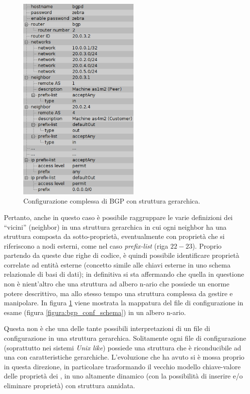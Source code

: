 \begin{figure}[!htb]
	\centering
	\includegraphics[width=6cm]{images/bgp_conf_tree.png}
	\caption{Configurazione complessa di BGP con struttura gerarchica.}
	\label{figura:bgp_conf_tree}
\end{figure}

Pertanto, anche in questo caso è possibile raggruppare le varie definizioni dei ``vicini'' (neighbor) in una struttura gerarchica in cui ogni neighbor ha una struttura composta da sotto-proprietà, eventualmente con proprietà che si riferiscono a nodi esterni, come nel caso \emph{prefix-list} (riga $22-23$). Proprio partendo da queste due righe di codice, è quindi possibile identificare proprietà correlate ad entità esterne (concetto simile alle chiavi esterne in uno schema relazionale di basi di dati); in definitiva si sta affermando che quella in questione non è nient'altro che una struttura ad albero n-ario che possiede un enorme potere descrittivo, ma allo stesso tempo una struttura complessa da gestire e manipolare. In figura \ref{figura:bgp_conf_tree} viene mostrata la mappatura del file di configurazione in esame (figura \ref{figura:bgp_conf_schema}) in un albero n-ario.

Questa non è che una delle tante possibili interpretazioni di un file di configurazione in una struttura gerarchica. Solitamente ogni file di configurazione (soprattutto nei sistemi \emph{Unix like}) possiede una struttura che è riconducibile ad una con caratteristiche gerarchiche. L'evoluzione che \visualnetkit{} ha avuto si è mossa proprio in questa direzione, in particolare trasformando il vecchio modello chiave-valore delle proprietà dei \plugin{}, in uno altamente dinamico (con la possibilità di inserire e/o eliminare proprietà) con struttura annidata.

